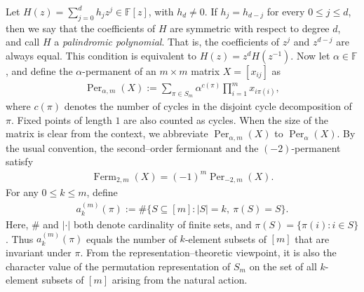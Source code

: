 \documentclass[11pt,a4paper]{article}
\begin{document}
Let $H(z)=\sum_{j=0}^{d}h_jz^j\in \mathbb{F}[z]$, with $h_d\ne0$. If $h_j=h_{d-j}$ for every $0\leq j\leq d$, then we say that the coefficients of $H$ are symmetric with respect to degree $d$, and call $H$ a {\em palindromic polynomial}. That is, the coefficients of $z^j$ and $z^{d-j}$ are always equal. This condition is equivalent to $H(z)=z^dH(z^{-1})$. Now let $\alpha\in\mathbb{F}$, and define the $\alpha$-permanent of an $m\times m$ matrix $X=[x_{ij}]$ as
\begin{eqnarray*}
  \operatorname{Per}_{\alpha,m}(X)
  :=\sum_{\pi\in S_m}\alpha^{c(\pi)}
  \prod_{i=1}^{m}x_{i\pi(i)},
\end{eqnarray*}
where $c(\pi)$ denotes the number of cycles in the disjoint cycle decomposition of $\pi$. Fixed points of length $1$ are also counted as cycles. When the size of the matrix is clear from the context, we abbreviate $\operatorname{Per}_{\alpha,m}(X)$ to $\operatorname{Per}_\alpha(X)$.
By the usual convention, the second–order fermionant and the $(-2)$-permanent satisfy
\begin{eqnarray*}
  \operatorname{Ferm}_{2,m}(X)=(-1)^m\operatorname{Per}_{-2,m}(X).
\end{eqnarray*}
For any $0\leq k\leq m$, define
\begin{eqnarray*}
  a_k^{(m)}(\pi)
  :=\#\{S\subseteq[m]: |S|=k,\ \pi(S)=S\}.
\end{eqnarray*}
Here, $\#$ and $|\cdot|$ both denote cardinality of finite sets, and $\pi(S)=\{\pi(i):i\in S\}$. Thus $a_k^{(m)}(\pi)$ equals the number of $k$-element subsets of $[m]$ that are invariant under $\pi$. From the representation–theoretic viewpoint, it is also the character value of the permutation representation of $S_m$ on the set of all $k$-element subsets of $[m]$ arising from the natural action.
\end{document}
